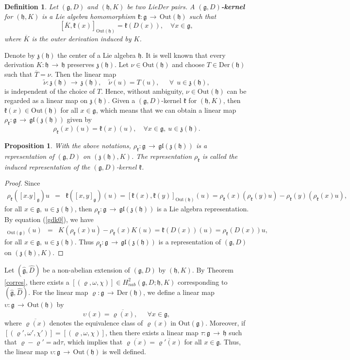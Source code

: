 \documentclass[12pt]{amsart}
\newtheorem{pro}[thm]{Proposition}
\newtheorem{defi}[thm]{Definition}
\newcommand{\lon }{\,\rightarrow\,}
\newcommand{\g}{\mathfrak g}
\newcommand{\h}{\mathfrak h}
\newcommand{\frkk}{\mathfrak k}
\newcommand{\frkz}{\mathfrak z}
\newcommand{\LD}{{\rm LieDer }}
\newcommand{\Der}{\mathrm{Der}}
\newcommand{\Out}{\mathrm{Out}}
\newcommand{\gl}{\mathfrak {gl}}
\newcommand{\ad}{\mathrm{ad}}
\begin{document}
\begin{defi}
    Let $(\g,D)$ and $(\h,K)$ be two \LD pairs. A {\bf $(\g,D)$-kernel} for $(\h, K)$ is a Lie algebra homomorphism $\frkk: \g\lon \Out(\h)$  such that 
    \begin{equation}\label{gdk0}
        [\overline{K},  \frkk(x)]_{\Out(\h)}=\frkk(D(x)),\quad \forall x\in\g,
    \end{equation}
    where $\overline{K}$ is the outer derivation induced by $K$.
\end{defi}
Denote by $\frkz(\h)$ the center of a Lie algebra $\h$. It is well known that every derivation $K:\h\lon\h$ preserves $\frkz(\h)$. Let $\nu\in\Out(\h)$ and choose $T\in\Der(\h)$ such that $\overline{T}=\nu$. Then the linear map $$\widetilde{\nu}:\frkz(\h)\lon\frkz(\h), \quad
\widetilde{\nu}(u)=T(u), \quad ~~\forall~~ u\in\frkz(\h),
$$
is independent of the choice of $T$. Hence, without ambiguity, $\nu\in\Out(\h)$ can be regarded as a linear map on $\frkz(\h)$.
Given a $(\g,D)$-kernel $\frkk$ for $(\h, K)$, then $\frkk(x)\in\Out(\h)$ for all $x\in\g$, which means that we can obtain a linear map $\rho_{\frkk}:\g\lon\gl(\frkz(\h))$ given by $$\rho_{\frkk}(x)(u)=\frkk(x)(u),\quad \forall x\in\g,\ u\in\frkz(\h).$$
\begin{pro}\label{repkk}
With the above notations,  $\rho_{\frkk}:\g\lon\gl(\frkz(\h))$ is a representation of $(\g,D)$ on $(\frkz(\h),K)$. The representation $\rho_{\frkk}$ is called the induced representation  of the $(\g,D)$-kernel $\frkk$.    
\end{pro}
\begin{proof}
Since
\begin{eqnarray*}
    \rho_{\frkk}([x.y]_{\g})u&=&\frkk([x,y]_{\g})(u)=[\frkk(x),\frkk(y)]_{\Out(\h)}(u)%
    =\rho_{\frkk}(x)(\rho_{\frkk}(y)u)-\rho_{\frkk}(y)(\rho_{\frkk}(x)u),
\end{eqnarray*}
for all $x\in\g,\ u\in \frkz(\h)$, then $\rho_{\frkk}:\g\lon\gl(\frkz(\h))$ is a Lie algebra representation. By equation (\ref{gdk0}), we have
\begin{eqnarray*}
   [\overline{K}, \frkk(x)]_{\Out(\g)}(u)&=&K(\rho_{\frkk}(x)u)-\rho_{\frkk}(x)K(u)=\frkk(D(x))(u)=\rho_{\frkk}(D(x))u,
\end{eqnarray*}
for all $x\in \g,\ u\in \frkz(\h)$. Thus $\rho_{\frkk}:\g\lon\gl(\frkz(\h))$ is a representation of $(\g,D)$ on $(\frkz(\h),K)$.
\end{proof}
Let $(\hat{\g}, \hat{D})$ be a non-abelian extension of $(\g, D)$ by $(\h, K)$. By Theorem \ref{corres}, there exists a $[(\varrho, \omega, \chi)]\in H^{2}_{nab}(\g, D;\h, K)$ corresponding to $(\hat{\g}, \hat{D})$. For the linear map $\varrho:\g\lon\Der(\h)$, we define a linear map $\upsilon:\g\lon\Out(\h)$ by
$$
\upsilon(x)=\overline{\varrho(x)}, \quad~~\forall x\in\g,
$$
where $\overline{\varrho(x)}$ denotes the equivalence class of $\varrho(x)$ in $\Out(\g)$. Moreover, if $[(\varrho', \omega', \chi')]=[(\varrho, \omega, \chi)]$, then there exists a linear map $\tau:\g\lon\h$ such that $\varrho-\varrho'=\ad\tau$, which implies that $\overline{\varrho(x)}=\overline{\varrho'(x)}$ for all $x\in\g$. Thus, the linear map $\upsilon:\g\lon\Out(\h)$ is well defined.
 
\end{document}
